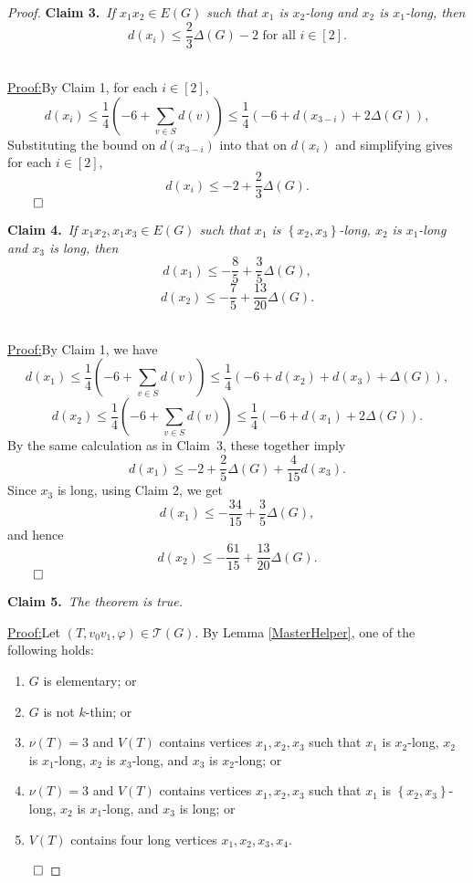 \documentclass[12pt]{amsart}
\theoremstyle{plain}
\theoremstyle{definition}
\theoremstyle{remark}
\newcommand{\fancy}[1]{\mathcal{#1}}
\newcommand{\T}{\fancy{T}}
\newcommand{\set}[1]{\left\{ #1 \right\}}
\newcommand{\irange}[1]{\left[#1\right]}
\newcommand{\parens}[1]{\left( #1 \right)}
\newcommand{\vph}{\varphi}
\newcommand{\claim}[2]{{\noindent\bf Claim #1.}~{\it #2}~~}
\newenvironment{claimproof}[1]{\par\noindent\underline{Proof:}\space#1}{\leavevmode\unskip\penalty9999
\hbox{}\nobreak\hfill\quad\hbox{$\qed$}}
\begin{document}
\begin{proof}
\claim{3}{If $x_1x_2 \in E(G)$ such that $x_1$ is $x_2$-long and $x_2$ is
$x_1$-long, %
then
\[d(x_i) \le \frac23\Delta(G) -2 \text{ for all $i \in \irange{2}$.}\]}

\begin{claimproof}
By Claim 1, for each $i \in \irange{2}$,
\[d(x_i) \le \frac14\parens{-6 + \sum_{v \in S} d(v)} \le \frac14\parens{-6 + d(x_{3-i}) + 2\Delta(G)},\]
Substituting the bound on $d(x_{3-i})$ into that on $d(x_i)$ and simplifying
gives for each $i \in \irange{2}$,
\[d(x_i) \le -2 + \frac23\Delta(G).\]
\end{claimproof}

\bigskip

\claim{4}{If $x_1x_2, x_1x_3 \in E(G)$ such that $x_1$ is $\set{x_2,x_3}$-long, $x_2$ is $x_1$-long and $x_3$ is long, then 
\[d(x_1) \le -\frac85 + \frac35\Delta(G),\]
\[d(x_2) \le -\frac75 + \frac{13}{20}\Delta(G).\]}

\begin{claimproof}
By Claim 1, we have
\[d(x_1) \le \frac14\parens{-6 + \sum_{v \in S} d(v)} \le \frac14\parens{-6 + d(x_2) + d(x_3) + \Delta(G)},\]
\[d(x_2) \le \frac14\parens{-6 + \sum_{v \in S} d(v)} \le \frac14\parens{-6 + d(x_1) + 2\Delta(G)}.\]
By the same calculation as in Claim~3, these together imply
\[d(x_1) \le -2 + \frac25\Delta(G) + \frac{4}{15}d(x_3).\]
Since $x_3$ is long, using Claim 2, we get
\[d(x_1) \le -\frac{34}{15} + \frac35\Delta(G),\]
and hence
\[d(x_2) \le -\frac{61}{15} + \frac{13}{20}\Delta(G).\]
\end{claimproof}
\bigskip

\claim{5}{The theorem is true.}

\begin{claimproof}
Let $(T, v_0v_1, \vph) \in \T(G)$. By Lemma \ref{MasterHelper}, one of the following holds:
\begin{enumerate}
\item $G$ is elementary; or
\item $G$ is not $k$-thin; or
\item $\nu(T) = 3$ and $V(T)$ contains vertices $x_1,x_2,x_3$ such that $x_1$
is $x_2$-long, $x_2$ is $x_1$-long, $x_2$ is $x_3$-long, and $x_3$ is $x_2$-long; or
\item $\nu(T) = 3$ and $V(T)$ contains vertices $x_1,x_2,x_3$ such that $x_1$ is
$\set{x_2,x_3}$-long, $x_2$ is $x_1$-long, and $x_3$ is long; or
\item $V(T)$ contains four long vertices $x_1, x_2, x_3, x_4$.
\end{enumerate}


\end{claimproof}
\end{proof}
\end{document}
